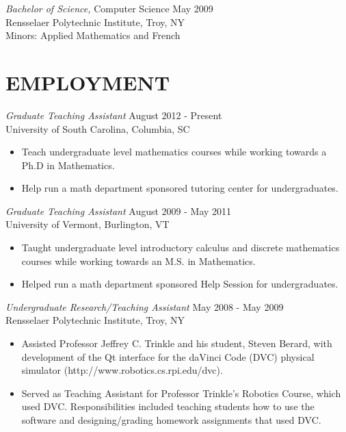 \documentclass[line,overlapped]{res}
\begin{document}
\begin{resume}
          \textsl{Bachelor of Science,} Computer Science \hfill May 2009\\
          Rensselaer Polytechnic Institute, Troy, NY\\
          Minors: Applied Mathematics and French
       
 \section{EMPLOYMENT}
         \textsl{Graduate Teaching Assistant} \hfill August 2012 - Present \\
         University of South Carolina, Columbia, SC
         \begin{itemize}  \itemsep -2pt %
         \item
           Teach undergraduate level mathematics courses while working towards a Ph.D in Mathematics.
         \item 
           Help run a math department sponsored tutoring center for undergraduates.
         \end{itemize}
        
         \textsl{Graduate Teaching Assistant} \hfill August 2009 - May 2011 \\
         University of Vermont, Burlington, VT
         \begin{itemize}  \itemsep -2pt %
         \item
           Taught undergraduate level introductory calculus and discrete mathematics courses while working towards an M.S. in Mathematics.
         \item 
           Helped run a math department sponsored Help Session for undergraduates.
         \end{itemize}

         \textsl{Undergraduate Research/Teaching Assistant} \hfill May 2008 - May 2009 \\
         Rensselaer Polytechnic Institute, Troy, NY
         \begin{itemize}  \itemsep -2pt %
         \item Assisted Professor Jeffrey C. Trinkle and his student, Steven Berard, with development of the Qt interface for the daVinci Code (DVC) physical simulator (http://www.robotics.cs.rpi.edu/dvc).
         \item Served as Teaching Assistant for Professor Trinkle's Robotics Course, which used DVC.
           Responsibilities included teaching students how to use the software and designing/grading homework assignments that used DVC.
         \end{itemize}


\end{resume}
\end{document}
